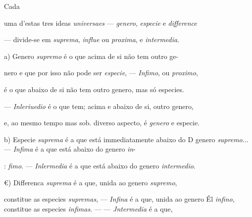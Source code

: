 
 
Cada

uma d'estas tres ideas \emph{universaes} --- \emph{genero}, \emph{especie} e \emph{difference}

--- divide-se em \emph{suprema}, \emph{influe} ou \emph{proxima}, e \emph{intermedia}.

a) Genero \emph{supremo} é o que acima de si não tem outro ge-

nero e que por isso não pode ser \emph{especie}, --- \emph{Infimo}, ou \emph{proximo},

é o que abaixo de si não tem outro genero, mas só especies.

--- \emph{Inleriuedio} é o que tem; acima e abaixo de si, outro genero,

e, ao mesmo tempo mas sob. diverso aspecto, é \emph{genero} e especie.

b) Especie \emph{suprema} é a que está immediatamente abaixo do D genero \emph{supremo}... --- \emph{Infima} é a que está abaixo do genero \emph{in}-

: \emph{fimo}. --- \emph{Inlermedia} é a que está abaixo do genero \emph{intermedio}.

€) Differenca \emph{suprema} é a que, unida ao genero \emph{supremo},

constitue as especies \emph{supremas}, --- \emph{Infina} é a que, unida ao genero Él \emph{infino}, constitue as especies \emph{infimas}. --- --- \emph{Jntermedia} é a que,

